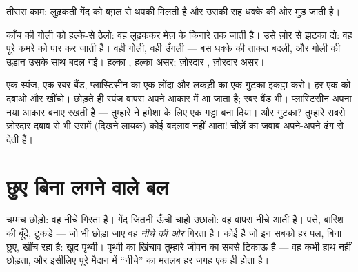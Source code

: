 \begin{omfigure}

{\small तीसरा काम: लुढ़कती गेंद को बग़ल से थपकी मिलती है और उसकी राह
धक्के की ओर मुड़ जाती है।}
\end{omfigure}

\begin{example}\label{ex:g2:pushes-and-pulls:stronger}
काँच की गोली को हल्के-से ठेलो: वह लुढ़ककर मेज़ के किनारे तक जाती है।
उसे ज़ोर से झटका दो: वह पूरे कमरे को पार कर जाती है। वही गोली, वही
उँगली --- बस धक्के की ताक़त बदली, और गोली की उड़ान उसके साथ बदल गई।
हल्का , हल्का असर; ज़ोरदार , ज़ोरदार असर।
\end{example}

\begin{example}\label{ex:g2:pushes-and-pulls:shape}
एक स्पंज, एक रबर बैंड, प्लास्टिसीन का एक लोंदा और लकड़ी का एक गुटका
इकट्ठा करो। हर एक को दबाओ और खींचो। छोड़ते ही स्पंज वापस अपने आकार
में आ जाता है; रबर बैंड भी। प्लास्टिसीन अपना नया आकार बनाए रखती है
--- तुम्हारे  ने हमेशा के लिए एक गड्ढा बना दिया। और गुटका?
तुम्हारे सबसे ज़ोरदार दबाव से भी उसमें (दिखने लायक) कोई बदलाव नहीं
आता! चीज़ें  का जवाब अपने-अपने ढंग से देती हैं।
\end{example}

\section{छुए बिना लगने वाले बल}

\begin{example}[पृथ्वी का खिंचाव]\label{ex:g2:pushes-and-pulls:earthpull}
चम्मच छोड़ो: वह नीचे गिरता है। गेंद जितनी ऊँची चाहो उछालो: वह वापस
नीचे आती है। पत्ते, बारिश की बूँदें, टुकड़े --- जो भी छोड़ा जाए वह
\emph{नीचे की ओर} गिरता है। कोई है जो इन सबको हर पल, बिना छुए, खींच
रहा है: ख़ुद पृथ्वी। पृथ्वी का खिंचाव तुम्हारे जीवन का सबसे टिकाऊ 
है --- वह कभी हाथ नहीं छोड़ता, और इसीलिए पूरे मैदान में ``नीचे'' का
मतलब हर जगह एक ही होता है।
\end{example}


